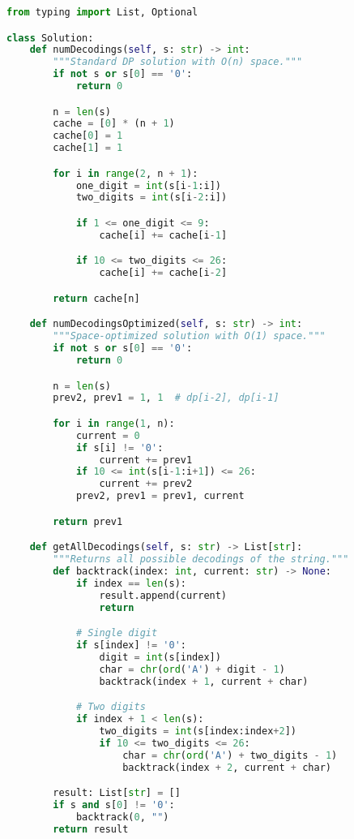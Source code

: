 \begin{fullwidth}
\begin{lstlisting}[language=Python]
from typing import List, Optional

class Solution:
    def numDecodings(self, s: str) -> int:
        """Standard DP solution with O(n) space."""
        if not s or s[0] == '0':
            return 0

        n = len(s)
        cache = [0] * (n + 1)
        cache[0] = 1
        cache[1] = 1

        for i in range(2, n + 1):
            one_digit = int(s[i-1:i])
            two_digits = int(s[i-2:i])

            if 1 <= one_digit <= 9:
                cache[i] += cache[i-1]

            if 10 <= two_digits <= 26:
                cache[i] += cache[i-2]

        return cache[n]

    def numDecodingsOptimized(self, s: str) -> int:
        """Space-optimized solution with O(1) space."""
        if not s or s[0] == '0':
            return 0

        n = len(s)
        prev2, prev1 = 1, 1  # dp[i-2], dp[i-1]

        for i in range(1, n):
            current = 0
            if s[i] != '0':
                current += prev1
            if 10 <= int(s[i-1:i+1]) <= 26:
                current += prev2
            prev2, prev1 = prev1, current

        return prev1

    def getAllDecodings(self, s: str) -> List[str]:
        """Returns all possible decodings of the string."""
        def backtrack(index: int, current: str) -> None:
            if index == len(s):
                result.append(current)
                return

            # Single digit
            if s[index] != '0':
                digit = int(s[index])
                char = chr(ord('A') + digit - 1)
                backtrack(index + 1, current + char)

            # Two digits
            if index + 1 < len(s):
                two_digits = int(s[index:index+2])
                if 10 <= two_digits <= 26:
                    char = chr(ord('A') + two_digits - 1)
                    backtrack(index + 2, current + char)

        result: List[str] = []
        if s and s[0] != '0':
            backtrack(0, "")
        return result


\end{lstlisting}
\end{fullwidth}
